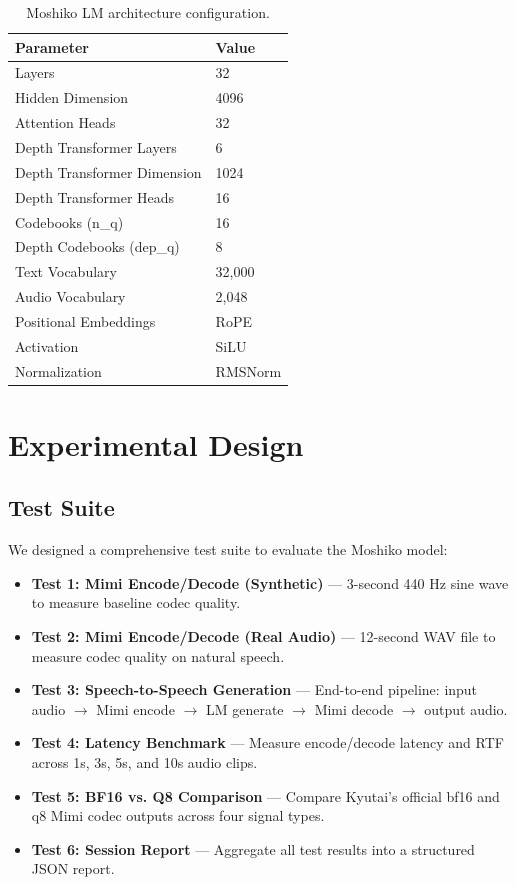 \documentclass[12pt,a4paper]{report}
\begin{document}
\begin{table}[H]
\centering
\caption{Moshiko LM architecture configuration.}
\label{tab:lm_config}
\begin{tabular}{@{}ll@{}}
\toprule
\textbf{Parameter} & \textbf{Value} \\
\midrule
Layers & 32 \\
Hidden Dimension & 4096 \\
Attention Heads & 32 \\
Depth Transformer Layers & 6 \\
Depth Transformer Dimension & 1024 \\
Depth Transformer Heads & 16 \\
Codebooks (n\_q) & 16 \\
Depth Codebooks (dep\_q) & 8 \\
Text Vocabulary & 32,000 \\
Audio Vocabulary & 2,048 \\
Positional Embeddings & RoPE \\
Activation & SiLU \\
Normalization & RMSNorm \\
\bottomrule
\end{tabular}
\end{table}

\section{Experimental Design}

\subsection{Test Suite}
We designed a comprehensive test suite to evaluate the Moshiko model:

\begin{itemize}
    \item \textbf{Test 1: Mimi Encode/Decode (Synthetic)} --- 3-second 440 Hz sine wave to measure baseline codec quality.
    \item \textbf{Test 2: Mimi Encode/Decode (Real Audio)} --- 12-second WAV file to measure codec quality on natural speech.
    \item \textbf{Test 3: Speech-to-Speech Generation} --- End-to-end pipeline: input audio $\rightarrow$ Mimi encode $\rightarrow$ LM generate $\rightarrow$ Mimi decode $\rightarrow$ output audio.
    \item \textbf{Test 4: Latency Benchmark} --- Measure encode/decode latency and RTF across 1s, 3s, 5s, and 10s audio clips.
    \item \textbf{Test 5: BF16 vs. Q8 Comparison} --- Compare Kyutai's official bf16 and q8 Mimi codec outputs across four signal types.
    \item \textbf{Test 6: Session Report} --- Aggregate all test results into a structured JSON report.
\end{itemize}
\end{document}
